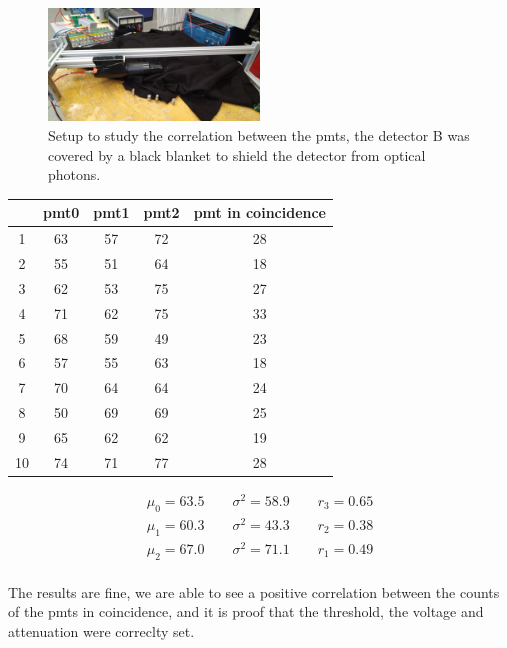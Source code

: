 \documentclass[10pt,a4paper]{article}
\begin{document}
\begin{figure}[hbtp]
\centering
\includegraphics[width = 0.5\textwidth]{figures/IMG_20221107_152816.jpg} 
\caption{Setup to study the correlation between the pmts, the detector B was covered by a black blanket to shield the detector from optical photons.}
\end{figure}
\begin{center}
\begin{tabular}{|c|c|c|c|c|}
\hline 
 & pmt0 & pmt1 & pmt2 & pmt in coincidence \\ 
\hline 
1 & 63 & 57 & 72 & 28 \\ 
\hline 
2 & 55 & 51 & 64 & 18 \\ 
\hline 
3 & 62 & 53 & 75 & 27 \\ 
\hline 
4 & 71 & 62 & 75 & 33 \\ 
\hline 
5 & 68 & 59 & 49 & 23 \\ 
\hline 
6 & 57 & 55 & 63 & 18 \\ 
\hline 
7 & 70 & 64 & 64 & 24 \\ 
\hline 
8 & 50 & 69 & 69 & 25 \\ 
\hline 
9 & 65 & 62 & 62 & 19 \\ 
\hline 
10 & 74 & 71 & 77 & 28 \\ 
\hline 

\end{tabular} 
\end{center}

\begin{equation*}
\begin{split}
\mu_{0} = 63.5 \qquad \sigma^{2} = 58.9 \qquad r_{3} = 0.65 \\
\mu_{1} = 60.3 \qquad \sigma^{2} = 43.3 \qquad r_{2} = 0.38 \\
\mu_{2} = 67.0 \qquad \sigma^{2} = 71.1 \qquad r_{1} = 0.49 \\
\end{split}
\end{equation*}

The results are fine, we are able to see a positive correlation between the counts of the pmts in coincidence, and it is proof that the threshold, the voltage and attenuation were correclty set.\newline
\end{document}
